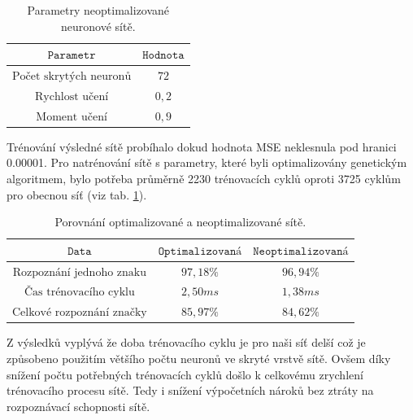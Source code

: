 \documentclass[12pt]{article}
\begin{document}
\begin{table}
\begin{tabular}{cc}
$\texttt{Parametr}$ & $\texttt{Hodnota}$					\\\hline
$\text{Počet skrytých neuronů}$ 	& $72$		\\
$\text{Rychlost učení}$ 			& $0,2$		\\
$\text{Moment učení}$ 				& $0,9$		\\
\end{tabular}
\caption{Parametry neoptimalizované neuronové sítě.}
\label{BPNN_attributes}
\end{table}

Trénování výsledné sítě probíhalo dokud hodnota MSE neklesnula pod hranici 0.00001. Pro natrénování sítě s parametry, které byli optimalizovány genetickým algoritmem, bylo potřeba průměrně 2230 trénovacích cyklů oproti 3725 cyklům pro obecnou síť \cite{thumb_rule} (viz tab. \ref{BPNN_attributes}).

\begin{table}[h]
\centering
\begin{tabular}{ccc}
$\texttt{Data}$ & $\texttt{Optimalizovaná}$ & $\texttt{Neoptimalizovaná}$\\\hline
$\text{Rozpoznání jednoho znaku}$ 	& $97,18\%$	& $96,94\%$		\\
$\text{Čas trénovacího cyklu}$ 		& $2,50ms$	& $1,38ms$		\\
$\text{Celkové rozpoznání značky}$ 	& $85,97\%$	& $84,62\%$		\\
\end{tabular}
\caption{Porovnání optimalizované a neoptimalizované sítě.}
\label{recognition_result}
\end{table}

\noindent
Z výsledků vyplývá že doba trénovacího cyklu je pro naši síť delší což je způsobeno použitím většího počtu neuronů ve skryté vrstvě sítě. Ovšem díky snížení počtu potřebných trénovacích cyklů došlo k celkovému zrychlení trénovacího procesu sítě. Tedy i snížení výpočetních nároků bez ztráty na rozpoznávací schopnosti sítě.



%
\end{document}
